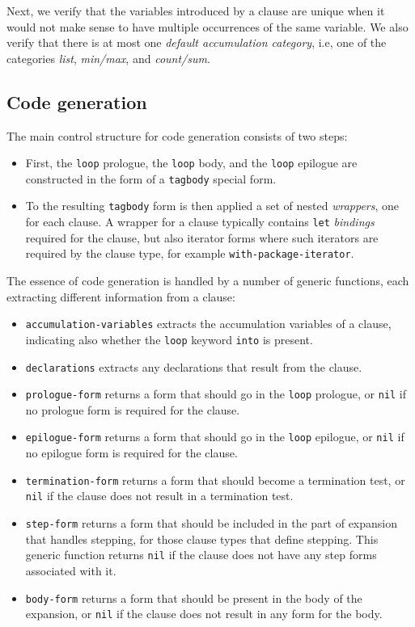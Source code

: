 Next, we verify that the variables introduced by a clause are unique
when it would not make sense to have multiple occurrences of the same
variable.  We also verify that there is at most one \emph{default
accumulation category}, i.e, one of the categories \emph{list},
\emph{min/max}, and \emph{count/sum}.

\subsection{Code generation}
\label{sec-our-technique-code generation}

The main control structure for code generation consists of two steps:

\begin{itemize}
\item First, the \texttt{loop} prologue, the \texttt{loop} body, and
  the \texttt{loop} epilogue are constructed in the form of a
  \texttt{tagbody} special form.
\item To the resulting \texttt{tagbody} form is then applied a set of
  nested \emph{wrappers}, one for each clause.  A wrapper for a clause
  typically contains \texttt{let} \emph{bindings} required for the
  clause, but also iterator forms where such iterators are required by
  the clause type, for example \texttt{with-package-iterator}.
\end{itemize}

The essence of code generation is handled by a number of generic
functions, each extracting different information from a clause:

\begin{itemize}
\item \texttt{accumulation-variables} extracts the accumulation
  variables of a clause, indicating also whether the \texttt{loop}
  keyword \texttt{into} is present.
\item \texttt{declarations} extracts any declarations that result from
  the clause.
\item \texttt{prologue-form} returns a form that should go in the
  \texttt{loop} prologue, or \texttt{nil} if no prologue form is
  required for the clause.
\item \texttt{epilogue-form} returns a form that should go in the
  \texttt{loop} epilogue, or \texttt{nil} if no epilogue form is
  required for the clause.
\item \texttt{termination-form} returns a form that should become a
  termination test, or \texttt{nil} if the clause does not result in a
  termination test.
\item \texttt{step-form} returns a form that should be included in the
  part of expansion that handles stepping, for those clause types that
  define stepping.  This generic function returns \texttt{nil} if the
  clause does not have any step forms associated with it.
\item \texttt{body-form} returns a form that should be present in the
  body of the expansion, or \texttt{nil} if the clause does not result
  in any form for the body.
\end{itemize}

